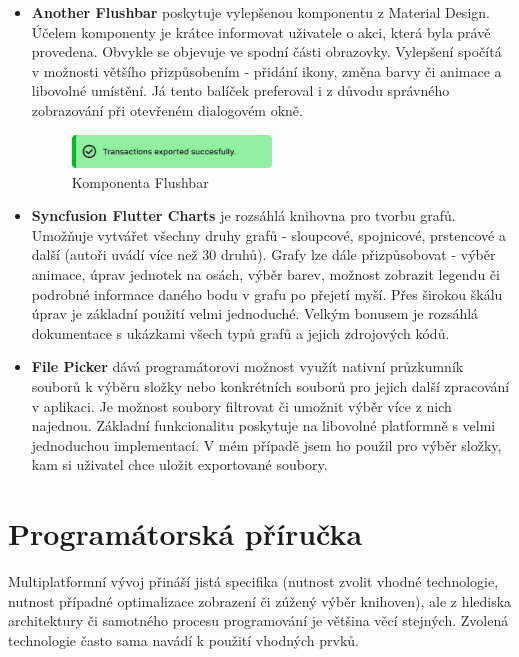 \documentclass[
  biblatex,
  figures=true,
  tables=false,
  glossaries,
  index
]{kidiplom}
\begin{document}
\begin{itemize}
  \item \textbf{Another Flushbar} poskytuje vylepšenou komponentu  z Material Design. Účelem komponenty je krátce informovat uživatele o akci, která byla právě provedena. Obvykle se objevuje ve spodní části obrazovky. Vylepšení spočítá v možnosti většího přizpůsobením - přidání ikony, změna barvy či animace a libovolné umístění. Já tento balíček preferoval i z důvodu správného zobrazování při otevřeném dialogovém okně.

\begin{figure}
	\centering
	\includegraphics[width=0.5\textwidth]{images/flushbar.pdf}
	\caption{Komponenta Flushbar}
\end{figure}
    
    
  \item \textbf{Syncfusion Flutter Charts} je rozsáhlá knihovna pro tvorbu grafů. Umožňuje vytvářet všechny druhy grafů - sloupcové, spojnicové, prstencové a další (autoři uvádí více než 30 druhů). Grafy lze dále přizpůsobovat - výběr animace, úprav jednotek na osách, výběr barev, možnost zobrazit legendu či podrobné informace daného bodu v grafu po přejetí myší. Přes širokou škálu úprav je základní použití velmi jednoduché. Velkým bonusem je rozsáhlá dokumentace s ukázkami všech typů grafů a jejich zdrojových kódů.
  \item \textbf{File Picker} dává programátorovi možnost využít nativní průzkumník souborů k výběru složky nebo konkrétních souborů pro jejich další zpracování v aplikaci. Je možnost soubory filtrovat či umožnit výběr více z nich najednou. Základní funkcionalitu poskytuje na libovolné platformně s velmi jednoduchou implementací. V mém případě jsem ho použil pro výběr složky, kam si uživatel chce uložit exportované soubory. 

\end{itemize}


\section{Programátorská příručka}

Multiplatformní vývoj přináší jistá specifika (nutnost zvolit vhodné technologie, nutnost případné optimalizace zobrazení či zúžený výběr knihoven), ale z hlediska architektury či samotného procesu programování je většina věcí stejných. Zvolená technologie často sama navádí k použití vhodných prvků.
\end{document}
